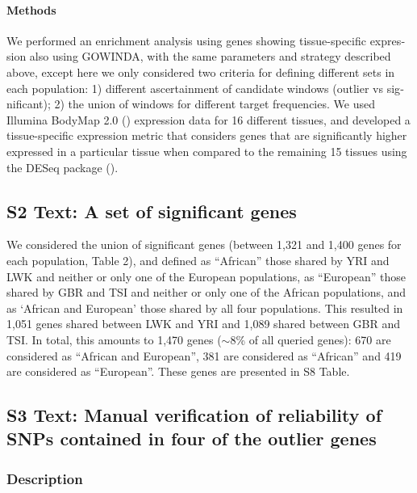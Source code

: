 \begin{refsection}
\begin{otherlanguage}{english}
\begin{footnotesize}
\paragraph{Methods} We performed an enrichment analysis using genes showing tissue-specific expression also using GOWINDA, with the same parameters and strategy described above, except here we only considered two criteria for defining different sets in each population: 1) different ascertainment of candidate windows (outlier vs significant); 2) the union of windows for different target frequencies. We used Illumina BodyMap 2.0 (\cite{Derrien2012}) expression data for 16 different tissues, and developed a tissue-specific expression metric that considers genes that are significantly higher expressed in a particular tissue when compared to the remaining 15 tissues using the DESeq package (\cite{Anders2010}). 


\subsection{S2 Text: A set of significant genes}

We considered the union of significant genes (between 1,321 and 1,400 genes for each population, Table 2), and defined as “African” those shared by YRI and LWK and neither or only one of the European populations, as “European” those shared by GBR and TSI and neither or only one of the African populations, and as ‘African and European’ those shared by all four populations. This resulted in 1,051 genes shared between LWK and YRI and 1,089 shared between GBR and TSI. In total, this amounts to 1,470 genes ($\sim8$\% of all queried genes): 670 are considered as “African and European”, 381 are considered as “African” and 419 are considered as “European”. These genes are presented in S8 Table.


\subsection{S3 Text: Manual verification of reliability of SNPs contained in four of the outlier genes}

\subsubsection{Description}


\end{footnotesize}
\end{otherlanguage}
\end{refsection}

